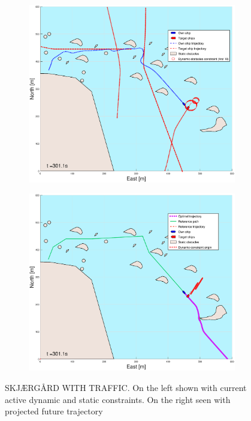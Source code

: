 \begin{figure}[ht]
\begin{subfigure}[b]{0.499\textwidth}
    \end{subfigure}
    \hfill
    \\
    \begin{subfigure}[b]{0.49\textwidth}
        \centering
        \includegraphics[width=\textwidth]{Images/Figures/skjergard_m_trafikk_NEW/_Simple_0fig1_time=301}
    \end{subfigure}
    \hfill
    \begin{subfigure}[b]{0.499\textwidth}
        \centering
        \includegraphics[width=\textwidth]{Images/Figures/skjergard_m_trafikk_NEW/_Simple_0fig999_time=301}
    \end{subfigure}
    \hfill
    \caption{SKJÆRGÅRD WITH TRAFFIC. On the left shown with current active dynamic and static constraints. On the right seen with projected future trajectory}
\end{figure}


